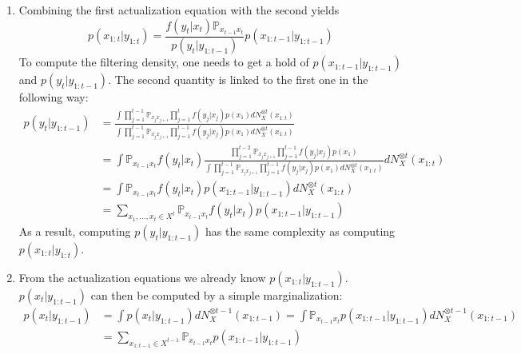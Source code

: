\documentclass[a4paper,11pt, hidelinks]{article}
\begin{document}
\begin{enumerate}[label=(\alph*)]
	\item Combining the first actualization equation with the second yields $$p(x_{1:t}|y_{1:t}) = \frac{f(y_t|x_t) \mathbb P_{x_{t-1}x_t}}{p(y_t|y_{1:t-1})}p(x_{1:t-1}|y_{1:t-1})$$
	To compute the filtering density, one needs to get a hold of $p(x_{1:t-1}|y_{1:t-1})$ and $p(y_t|y_{1:t-1})$. The second quantity is linked to the first one in the following way: 
	$$\begin{aligned}
		p(y_t|y_{1:t-1}) &= \frac{\int \prod_{j=1}^{t-1}\mathbb P_{x_{j} x_{j+1}} \prod_{j=1}^{t}f(y_j|x_j) p(x_1) dN_X^{\otimes t}(x_{1:t})}{\int \prod_{j=1}^{t-1}\mathbb P_{x_{j} x_{j+1}} \prod_{j=1}^{t-1}f(y_j|x_j) p(x_1) dN_X^{\otimes t}(x_{1:t})}\\
		&= \int \mathbb P_{x_{t-1} x_t} f(y_t|x_t) \frac{\prod_{j=1}^{t-2}\mathbb P_{x_{j} x_{j+1}} \prod_{j=1}^{t-1}f(y_j|x_j) p(x_1) }{\int \prod_{j=1}^{t-1}\mathbb P_{x_{j} x_{j+1}} \prod_{j=1}^{t-1}f(y_j|x_j) p(x_1) dN_X^{\otimes t}(x_{1:t})} dN_X^{\otimes t}(x_{1:t}) \\
		&= \int \mathbb P_{x_{t-1} x_t} f(y_t|x_t) p(x_{1:t-1}|y_{1:t-1}) dN_X^{\otimes t}(x_{1:t})\\
		&= \sum_{x_1,\ldots,x_t\in X^t} \mathbb P_{x_{t-1} x_t} f(y_t|x_t) p(x_{1:t-1}|y_{1:t-1})
	\end{aligned}$$
	As a result, computing $p(y_t|y_{1:t-1})$ has the same complexity as computing $p(x_{1:t}|y_{1:t})$.

	\item From the actualization equations we already know $p(x_{1:t}|y_{1:t-1})$. $p(x_{t}|y_{1:t-1})$ can then be computed by a simple marginalization:
	$$\begin{aligned}
		p(x_{t}|y_{1:t-1}) &= \int p(x_{t}|y_{1:t-1}) dN_X^{\otimes t-1}(x_{1:t-1}) = \int \mathbb P_{x_{t-1}x_t}p(x_{1:t-1}|y_{1:t-1}) dN_X^{\otimes t-1}(x_{1:t-1})\\
		&= \sum_{x_{1:t-1}\in X^{t-1}} \mathbb P_{x_{t-1}x_t}p(x_{1:t-1}|y_{1:t-1})
	\end{aligned}$$
\end{enumerate}
\end{document}
